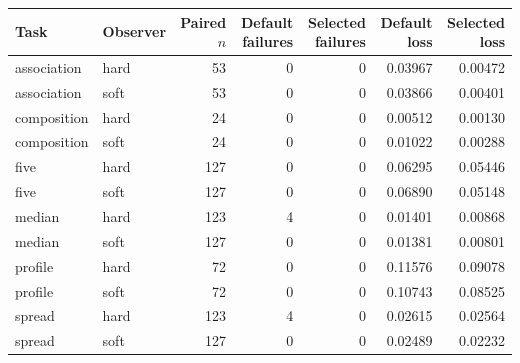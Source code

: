 \begin{longtable}{llrrrrr}\toprule
Task & Observer & Paired $n$ & Default failures & Selected failures & Default loss & Selected loss\\\midrule\endhead
association & hard & 53 & 0 & 0 & 0.03967 & 0.00472\\
association & soft & 53 & 0 & 0 & 0.03866 & 0.00401\\
composition & hard & 24 & 0 & 0 & 0.00512 & 0.00130\\
composition & soft & 24 & 0 & 0 & 0.01022 & 0.00288\\
five & hard & 127 & 0 & 0 & 0.06295 & 0.05446\\
five & soft & 127 & 0 & 0 & 0.06890 & 0.05148\\
median & hard & 123 & 4 & 0 & 0.01401 & 0.00868\\
median & soft & 127 & 0 & 0 & 0.01381 & 0.00801\\
profile & hard & 72 & 0 & 0 & 0.11576 & 0.09078\\
profile & soft & 72 & 0 & 0 & 0.10743 & 0.08525\\
spread & hard & 123 & 4 & 0 & 0.02615 & 0.02564\\
spread & soft & 127 & 0 & 0 & 0.02489 & 0.02232\\
\bottomrule\end{longtable}